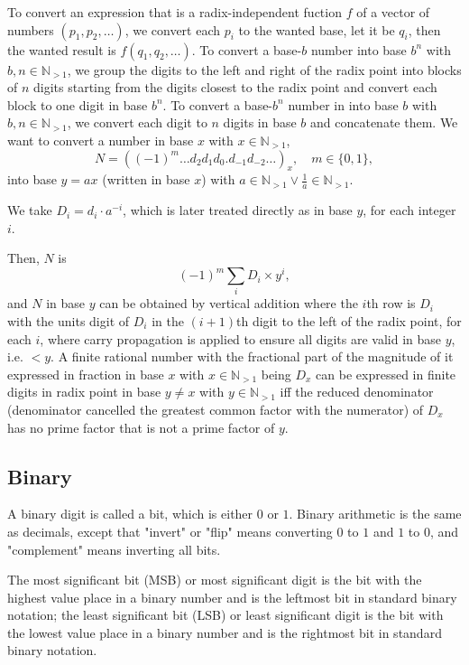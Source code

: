 \documentclass[a4paper,12pt]{report}
\begin{document}
To convert an expression that is a radix-independent fuction $f$ of a vector of numbers $(p_1,p_2,\ldots)$, we convert each $p_i$ to the wanted base, let it be $q_i$, then the wanted result is $f(q_1,q_2,\ldots)$.
To convert a base-$b$ number into base $b^n$ with $b,n\in\mathbb{N}_{>1}$, we group the digits to the left and right of the radix point into blocks of $n$ digits starting from the digits closest to the radix point and convert each block to one digit in base $b^n$.
To convert a base-$b^n$ number in into base $b$ with $b,n\in\mathbb{N}_{>1}$, we convert each digit to $n$ digits in base $b$ and concatenate them.
We want to convert a number in base $x$ with $x\in\mathbb{N}_{>1}$,
\[N=((-1)^m\ldots d_2d_1d_0.d_{-1}d_{-2}\ldots)_x,\quad m\in\{0,1\},\]
into base $y=ax$ (written in base $x$) with $a\in\mathbb{N}_{>1}\lor\frac{1}{a}\in\mathbb{N}_{>1}$.

We take $D_i=d_i\cdot a^{-i}$, which is later treated directly as in base $y$, for each integer $i$.

Then, $N$ is
\[(-1)^m\sum_iD_i\times y^i,\]
and $N$ in base $y$ can be obtained by vertical addition where the $i$th row is $D_i$ with the units digit of $D_i$ in the $(i+1)$th digit to the left of the radix point, for each $i$, where carry propagation is applied to ensure all digits are valid in base $y$, i.e. $<y$.
A finite rational number with the fractional part of the magnitude of it expressed in fraction in base $x$ with $x\in\mathbb{N}_{>1}$ being $D_x$ can be expressed in finite digits in radix point in base $y\neq x$ with $y\in\mathbb{N}_{>1}$ iff the reduced denominator (denominator cancelled the greatest common factor with the numerator) of $D_x$ has no prime factor that is not a prime factor of $y$.
\subsection{Binary}
A binary digit is called a bit, which is either $0$ or $1$. Binary arithmetic is the same as decimals, except that "invert" or "flip" means converting $0$ to $1$ and $1$ to $0$, and "complement" means inverting all bits.

The most significant bit (MSB) or most significant digit is the bit with the highest value place in a binary number and is the leftmost bit in standard binary notation; the least significant bit (LSB) or least significant digit is the bit with the lowest value place in a binary number and is the rightmost bit in standard binary notation.
\end{document}
